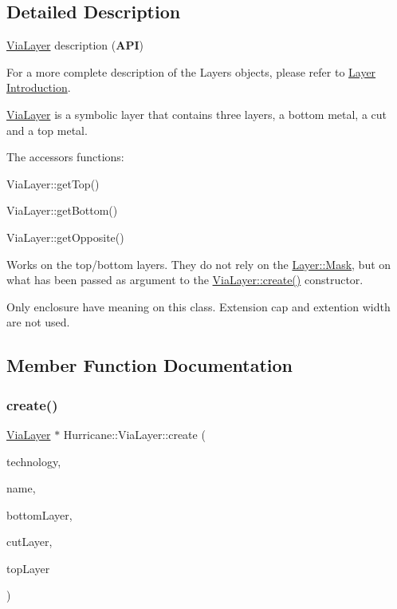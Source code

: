 \subsection{Detailed Description}
\hyperlink{classHurricane_1_1ViaLayer}{Via\+Layer} description ({\bfseries A\+PI}) 

For a more complete description of the Layers objects, please refer to \hyperlink{classHurricane_1_1Layer_secLayerIntro}{Layer Introduction}.

\hyperlink{classHurricane_1_1ViaLayer}{Via\+Layer} is a symbolic layer that contains three layers, a bottom metal, a cut and a top metal.

The accessors functions\+: 
\begin{DoxyItemize}
\item Via\+Layer\+::get\+Top() 
\item Via\+Layer\+::get\+Bottom() 
\item Via\+Layer\+::get\+Opposite() 
\end{DoxyItemize}Works on the top/bottom layers. They do not rely on the \hyperlink{classHurricane_1_1Layer_af5277c670637bd5d910237e7afe01a91}{Layer\+::\+Mask}, but on what has been passed as argument to the \hyperlink{classHurricane_1_1ViaLayer_af2a6aa6c3a92fb1427b21662eeed7abd}{Via\+Layer\+::create()} constructor.

Only enclosure have meaning on this class. Extension cap and extention width are not used. 

\subsection{Member Function Documentation}
\mbox{\label{classHurricane_1_1ViaLayer_af2a6aa6c3a92fb1427b21662eeed7abd}} 
\subsubsection{\texorpdfstring{create()}{create()}}
{\footnotesize\ttfamily \hyperlink{classHurricane_1_1ViaLayer}{Via\+Layer} $\ast$ Hurricane\+::\+Via\+Layer\+::create (\begin{DoxyParamCaption}\item[{\hyperlink{classHurricane_1_1Technology}{Technology} $\ast$}]{technology,  }\item[{const \hyperlink{classHurricane_1_1Name}{Name} \&}]{name,  }\item[{\hyperlink{classHurricane_1_1BasicLayer}{Basic\+Layer} $\ast$}]{bottom\+Layer,  }\item[{\hyperlink{classHurricane_1_1BasicLayer}{Basic\+Layer} $\ast$}]{cut\+Layer,  }\item[{\hyperlink{classHurricane_1_1BasicLayer}{Basic\+Layer} $\ast$}]{top\+Layer }\end{DoxyParamCaption})\hspace{0.3cm}{\ttfamily [static]}}


